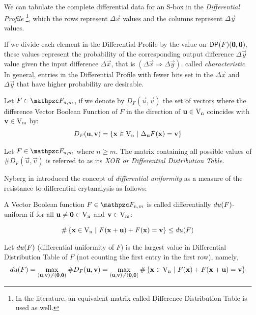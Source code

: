 We can tabulate the complete differential data for an S-box in the \textit{Differential Profile} \footnote{In the literature, an equivalent matrix called Difference Distribution Table is used as well.}, which the rows represent $\Delta \vec{x}$ values and the columns represent $\Delta \vec{y}$ values. 

If we divide each element in the Differential Profile by the value on $\matr{DP}(F)(\vec{0},\vec{0})$, these values represent the probability of the corresponding output difference $\Delta \vec{y}$ value given the input difference $\Delta \vec{x}$, that is $(\Delta \vec{x} \Rightarrow \Delta \vec{y})$, called \textit{characteristic}. In general, entries in the Differential Profile with fewer bits set in the $\Delta \vec{x}$ and $\Delta \vec{y}$ that have higher probability are desirable.

\begin{definition}
Let $F \in \funct{F}_{n,m}$, if we denote by $D_F(\vec{u},\vec{v})$ the set of vectors where the difference Vector Boolean Function of $F$ in the direction of $\vec{u} \in \gf{V_n}$ coincides with $\vec{v} \in \gf{V_m}$ by:
\begin{equation}
D_F(\vec{u},\vec{v}) = \left\{\vec{x} \in \gf{V_n} \given \Delta_{\vec{u}}F(\vec{x}) = \vec{v} \right\} 
\end{equation}
\end{definition}

\begin{definition}
Let $F \in \funct{F}_{n,m}$ where $n \geq m$. The matrix containing all possible values of $\#D_F(\vec{u},\vec{v})$ is referred to as its \textit{XOR or Differential Distribution Table}.
\end{definition}

Nyberg in \cite{Nyberg:93} introduced the concept of \textit{differential uniformity} as a measure of the resistance to differential crytanalysis as follows:

\begin{definition}\label{def:DifferentialUniformity}
A Vector Boolean function $F \in \funct{F}_{n,m}$ is called differentially $\crit{du}(F)$-uniform if for all $\vec{u} \neq \vec{0} \in \gf{V_n}$ and $\vec{v} \in \gf{V_m}$:

\begin{equation}
\# \left\{ \vec{x} \in \gf{V_n} \given F(\vec{x} + \vec{u}) + F(\vec{x}) = \vec{v} \right\} \leq \crit{du}(F)
\end{equation}

Let $\crit{du}(F)$ (differential uniformity of $F$) is the largest value in Differential Distribution Table of $F$ (not counting the first entry in the first row), namely,
\begin{equation}
\crit{du}(F) = \max_{(\vec{u},\vec{v}) \neq (\vec{0},\vec{0})} \#D_F(\vec{u},\vec{v}) = \max_{(\vec{u},\vec{v}) \neq (\vec{0},\vec{0})} \#\left\{ \vec{x} \in \gf{V_n} \given F(\vec{x}) + F(\vec{x}+\vec{u}) = \vec{v} \right\} 
\end{equation}
\end{definition}

